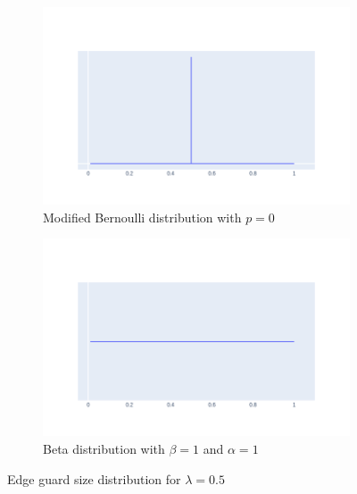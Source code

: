 \begin{figure}[H]
	\centering
	\begin{subfigure}{.5\textwidth}
		\centering
		\includegraphics[width=\linewidth]{Dists/Bernoulli50.png}
		\caption{Modified Bernoulli distribution with $p=0$}
	\end{subfigure}%
	\begin{subfigure}{.5\textwidth}
		\centering
		\includegraphics[width=\linewidth]{Dists/Beta50.png}
		\caption{Beta distribution with $\beta=1$ and $\alpha=1$}
	\end{subfigure}
	\caption{Edge guard size distribution for $\lambda = 0.5$}
	\label{fig:dist_lambda50}
\end{figure}%
